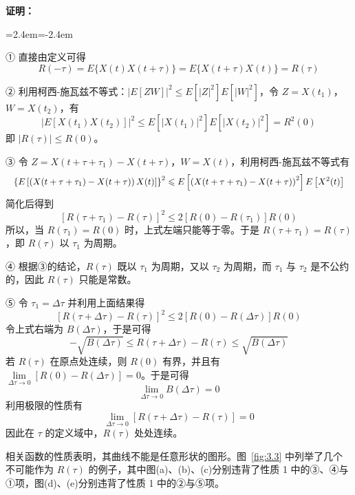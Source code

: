 \documentclass[11pt,openany,UTF8]{ctexbook}
\newcommand{\E}{E}                                 %
\newenvironment{citemize}
  {\begin{list}{}{\leftmargin=2.4em\itemindent=-2.4em\itemsep=1pt\topsep=3pt\parsep=0pt}}
  {\end{list}}
\begin{document}
\textbf{证明\nobreak：}
\begin{citemize}
\item ① 直接由定义可得
\[
R(-\tau)=\E\{X(t)X(t+\tau)\}=\E\{X(t+\tau)X(t)\}=R(\tau)
\]
\item ② 利用柯西-施瓦兹不等式\nobreak：$\lvert\E[ZW]\rvert^2\leqslant\E\left[\lvert Z\rvert^2\right]\E\left[\lvert W\rvert^2\right]$\nobreak，令 $Z=X(t_1)$\nobreak，$W=X(t_2)$\nobreak，有
\[
\lvert\E[X(t_1)X(t_2)]\rvert^2\leqslant\E\left[\lvert X(t_1)\rvert^2\right]\E\left[\lvert X(t_2)\rvert^2\right]=R^2(0)
\]
即 $\lvert R(\tau)\rvert\leqslant R(0)$\nobreak。
\item ③ 令 $Z=X(t+\tau+\tau_1)-X(t+\tau)$\nobreak，$W=X(t)$\nobreak，利用柯西-施瓦兹不等式有
\[
\resizebox{\linewidth}{!}{$\displaystyle
\left\{\E\left[\left(X(t+\tau+\tau_1)-X(t+\tau)\right)X(t)\right]\right\}^2\leqslant\E\left[\left(X(t+\tau+\tau_1)-X(t+\tau)\right)^2\right]\E\left[X^2(t)\right]$}
\]
简化后得到
\[
\left[R(\tau+\tau_1)-R(\tau)\right]^2\leqslant 2\left[R(0)-R(\tau_1)\right]R(0)
\]
所以\nobreak，当 $R(\tau_1)=R(0)$ 时\nobreak，上式左端只能等于零\nobreak。于是 $R(\tau+\tau_1)=R(\tau)$\nobreak，即 $R(\tau)$ 以 $\tau_1$ 为周期\nobreak。
\item ④ 根据③的结论\nobreak，$R(\tau)$ 既以 $\tau_1$ 为周期\nobreak，又以 $\tau_2$ 为周期\nobreak，而 $\tau_1$ 与 $\tau_2$ 是不公约的\nobreak，因此 $R(\tau)$ 只能是常数\nobreak。
\item ⑤ 令 $\tau_1=\Delta\tau$ 并利用上面结果得
\[
\left[R(\tau+\Delta\tau)-R(\tau)\right]^2\leqslant 2\left[R(0)-R(\Delta\tau)\right]R(0)
\]
令上式右端为 $B(\Delta\tau)$\nobreak，于是可得
\[
-\sqrt{B(\Delta\tau)}\leqslant R(\tau+\Delta\tau)-R(\tau)\leqslant\sqrt{B(\Delta\tau)}
\]
若 $R(\tau)$ 在原点处连续\nobreak，则 $R(0)$ 有界\nobreak，并且有 $\lim\limits_{\Delta\tau\to 0}\left[R(0)-R(\Delta\tau)\right]=0$\nobreak。于是可得
\[
\lim_{\Delta\tau\to 0}B(\Delta\tau)=0
\]
利用极限的性质有
\[
\lim_{\Delta\tau\to 0}\left[R(\tau+\Delta\tau)-R(\tau)\right]=0
\]
因此在 $\tau$ 的定义域中\nobreak，$R(\tau)$ 处处连续\nobreak。
\end{citemize}

相关函数的性质表明\nobreak，其曲线不能是任意形状的图形\nobreak。图~\ref{fig:3.3} 中列举了几个不可能作为 $R(\tau)$ 的例子\nobreak，其中图(a)\nobreak、(b)\nobreak、(c)分别违背了性质 1 中的③\nobreak、④与①项\nobreak，图(d)\nobreak、(e)分别违背了性质 1 中的②与⑤项\nobreak。
\end{document}
